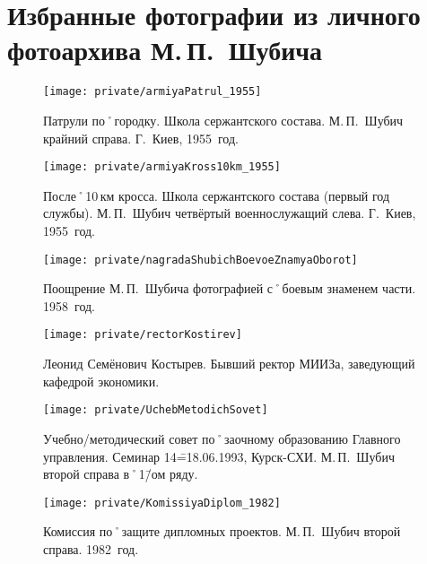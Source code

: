 ﻿\section{Избранные фотографии из личного фотоархива М.\,П.~Шубича}

\begin{figure}[h]
\texttt{[image: private/armiyaPatrul\_1955]}
\caption{Патрули по˚городку. Школа сержантского состава. М.\,П.~Шубич крайний справа. Г.~Киев, 1955~год.}
\label{fig:armiyaPatrul_1955}
\end{figure}

\begin{figure}[h]
\texttt{[image: private/armiyaKross10km\_1955]}
\caption{После˚10\,км кросса. Школа сержантского состава (первый год службы). М.\,П.~Шубич четвёртый военнослужащий слева. Г.~Киев, 1955~год.}
\label{fig:armiyaKross10km_1955}
\end{figure}


\begin{figure}[h]
\texttt{[image: private/nagradaShubichBoevoeZnamyaOborot]}
\caption{Поощрение М.\,П.~Шубича фотографией с˚боевым знаменем части. 1958~год.}
\label{fig:nagradaShubichBoevoeZnamyaOborot}
\end{figure}

\begin{figure}[h]
\texttt{[image: private/rectorKostirev]}
\caption{Леонид Семёнович Костырев. Бывший ректор МИИЗа, заведующий кафедрой экономики.}
\label{fig:rectorKostirev}
\end{figure}


\begin{figure}[h]
\texttt{[image: private/UchebMetodichSovet]}
\caption{Учебно\-/методический совет по˚заочному образованию Главного управления. Семинар 14\==18.06.1993, Курск-СХИ. М.\,П.~Шубич второй справа в˚1\=/ом ряду.}
\label{fig:UchebMetodichSovet}
\end{figure}

\begin{figure}[h]
\texttt{[image: private/KomissiyaDiplom\_1982]}
\caption{Комиссия по˚защите дипломных проектов. М.\,П.~Шубич второй справа. 1982~год.}
\label{fig:KomissiyaDiplom_1982}
\end{figure}

